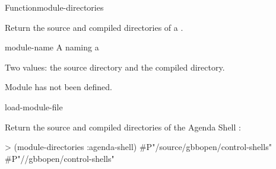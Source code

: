 \documentclass[10pt,twoside,english,pdftex]{article}
\begin{document}
\begin{functiondoc}{Function}{module-directories}{
    \mbox{\returns{} }}
%
%

\fnsyntax 

\fnpurpose Return the source and compiled directories of a .

\fnpackage {}

\fnmodule {}

\fnargs
\begin{args}{module-name}
 A  naming a 
\end{args}

\fnreturns Two values: the source directory and the compiled directory.

\fnerrors
Module  has not been defined.\\
\relativedircircularity

\begin{alsos}{load-module-file}
\end{alsos}

\fnexample
%
Return the source and compiled directories of the Agenda Shell :
%
\W\supp
\begin{example}
> (module-directories :agenda-shell)
#P"/source/gbbopen/control-shells"
#P"//gbbopen/control-shells"
\end{example} 

\end{functiondoc}

\end{document}
